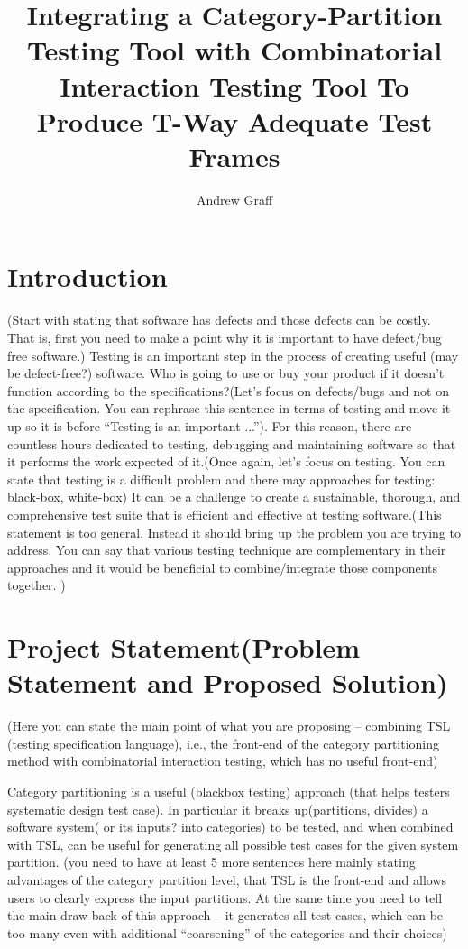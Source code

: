 \documentclass[a4full,12pt]{article}
\title{Integrating a Category-Partition Testing Tool with Combinatorial Interaction
Testing Tool To Produce T-Way Adequate Test Frames}
\author{Andrew Graff}
\newcommand{\eas}[1]{{\color{blue}\sf ({#1})}}
\begin{document}
\maketitle
\section{Introduction}
\eas{Start with stating that software has defects and those defects can be costly. That is, first you need to make a point why it is important to have defect/bug free software.} Testing is an important step in the process of creating useful \eas{may be defect-free?} software. Who is
  going to use or buy your product if it doesn't function according to the  specifications?\eas{Let's focus on defects/bugs and not on the specification. You can rephrase this sentence in terms of testing and move it up so it is before ``Testing is an important ...''}.  For this reason, there are countless hours dedicated to  testing, debugging and maintaining software so that it performs the work expected of it.\eas{Once again, let's focus on testing. You can state that testing is a difficult problem and there may approaches for testing: black-box, white-box} It can be a challenge to create a sustainable, thorough, and comprehensive test suite that is efficient and effective at testing software.\eas{This statement is too general. Instead it should bring up the problem you are trying to address. You can say that various testing technique are complementary in their approaches and it would be beneficial to combine/integrate those components together. }
  
  
\section{Project Statement\eas{Problem Statement and Proposed Solution}}
  \eas{Here you can state the main point of what you are proposing -- combining TSL (testing specification language), i.e., the front-end of the category partitioning method with combinatorial interaction testing, which has no useful front-end}
  
Category partitioning is a useful \eas{blackbox testing} approach  \eas{that helps testers systematic design test case}. In particular it breaks up\eas{partitions, divides} a software system\eas{ or its inputs? into categories} to be tested, and when combined with TSL, can be useful for generating all possible test cases for the given system partition. \eas{you need to have at least 5 more sentences here mainly stating advantages of the category partition level, that TSL is the front-end and allows users to clearly express the input partitions. At the same time you need to tell the main draw-back of this approach -- it generates all test cases, which can be too many even with additional ``coarsening'' of the categories and their choices}
\end{document}
